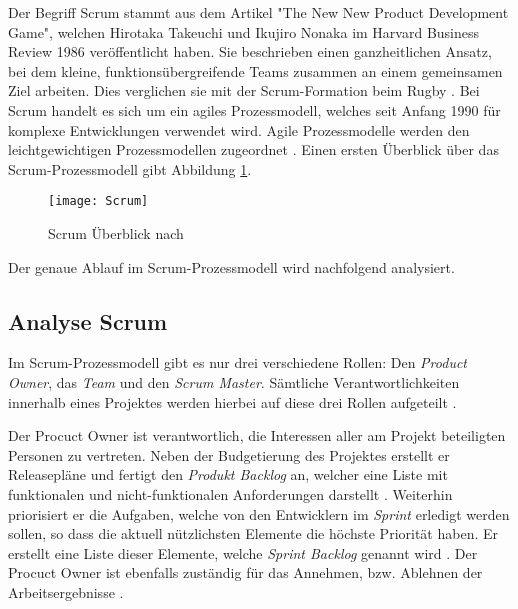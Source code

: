 Der Begriff Scrum stammt aus dem Artikel "The New New Product Development Game", welchen Hirotaka Takeuchi und Ikujiro Nonaka im Harvard Business Review 1986 veröffentlicht haben. Sie beschrieben einen ganzheitlichen Ansatz, bei dem kleine, funktionsübergreifende Teams zusammen an einem gemeinsamen Ziel arbeiten. Dies verglichen sie mit der Scrum-Formation beim Rugby \cite{Pham2012,Takeuchi1986}. \newline
Bei Scrum handelt es sich um ein agiles Prozessmodell, welches seit Anfang 1990 für komplexe Entwicklungen verwendet wird. Agile Prozessmodelle werden den leichtgewichtigen Prozessmodellen zugeordnet \cite{Hanser2010, Lacey2012}. Einen ersten Überblick über das Scrum-Prozessmodell gibt Abbildung \ref{fig:Scrum}.
\begin{figure}[htp]
\begin{center}
  \texttt{[image: Scrum]} %
  \caption{Scrum Überblick nach \cite{scrum2008}}
  \label{fig:Scrum}
\end{center}
\end{figure}
Der genaue Ablauf im Scrum-Prozessmodell wird nachfolgend analysiert.

\subsection{Analyse Scrum}


Im Scrum-Prozessmodell gibt es nur drei verschiedene Rollen: Den \textit{Product Owner}, das \textit{Team} und den \textit{Scrum Master}. Sämtliche Verantwortlichkeiten innerhalb eines Projektes werden hierbei auf diese drei Rollen aufgeteilt \cite{Schwaber2004}. \newline

Der Procuct Owner ist verantwortlich, die Interessen aller am Projekt beteiligten Personen zu vertreten. Neben der Budgetierung des Projektes erstellt er  Releasepläne und fertigt den \textit{Produkt Backlog} an, welcher eine Liste mit funktionalen und nicht-funktionalen Anforderungen darstellt \cite{Schwaber2004, Pichler2010,Schwaber2007}. Weiterhin priorisiert er die Aufgaben, welche von den Entwicklern im \textit{Sprint} erledigt werden sollen, so dass die aktuell nützlichsten Elemente die höchste Priorität haben. Er erstellt eine Liste dieser Elemente, welche \textit{Sprint Backlog} genannt wird \cite{Henning2011, Schwaber2007,Pichler2010}. Der Procuct Owner ist ebenfalls zuständig für das Annehmen, bzw. Ablehnen der Arbeitsergebnisse \cite{eclipseScrum}. \newline

